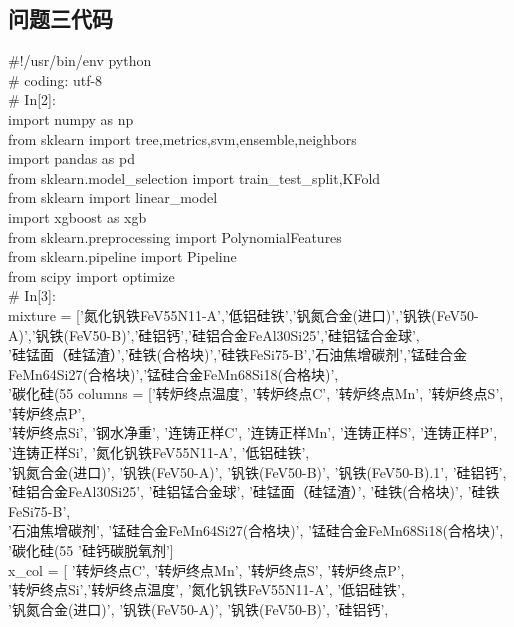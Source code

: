 \documentclass{xcumcmart}
\begin{document}
\subsection{问题三代码}
\noindent
\#!/usr/bin/env python \\
\# coding: utf-8 \\
\# In[2]: \\
import numpy as np \\
from sklearn import tree,metrics,svm,ensemble,neighbors \\
import pandas as pd \\
from sklearn.model\_selection import train\_test\_split,KFold \\
from sklearn import linear\_model \\
import xgboost as xgb \\
from sklearn.preprocessing import PolynomialFeatures \\
from sklearn.pipeline import Pipeline \\
from scipy import optimize \\
\# In[3]: \\
mixture = ['氮化钒铁FeV55N11-A','低铝硅铁','钒氮合金(进口)','钒铁(FeV50-A)','钒铁(FeV50-B)','硅铝钙','硅铝合金FeAl30Si25','硅铝锰合金球', \\
'硅锰面（硅锰渣）','硅铁(合格块)','硅铁FeSi75-B','石油焦增碳剂','锰硅合金FeMn64Si27(合格块)','锰硅合金FeMn68Si18(合格块)', \\
'碳化硅(55%
columns = ['转炉终点温度', '转炉终点C', '转炉终点Mn', '转炉终点S', '转炉终点P', \\
'转炉终点Si', '钢水净重', '连铸正样C', '连铸正样Mn', '连铸正样S', '连铸正样P', '连铸正样Si', '氮化钒铁FeV55N11-A', '低铝硅铁', \\
'钒氮合金(进口)', '钒铁(FeV50-A)', '钒铁(FeV50-B)', '钒铁(FeV50-B).1', '硅铝钙', \\
'硅铝合金FeAl30Si25', '硅铝锰合金球', '硅锰面（硅锰渣）', '硅铁(合格块)', '硅铁FeSi75-B', \\
'石油焦增碳剂', '锰硅合金FeMn64Si27(合格块)', '锰硅合金FeMn68Si18(合格块)', '碳化硅(55%
'硅钙碳脱氧剂'] \\
x\_col = [ '转炉终点C', '转炉终点Mn', '转炉终点S', '转炉终点P', \\
'转炉终点Si','转炉终点温度', '氮化钒铁FeV55N11-A', '低铝硅铁', \\
'钒氮合金(进口)', '钒铁(FeV50-A)', '钒铁(FeV50-B)', '硅铝钙', \\
\end{document}
